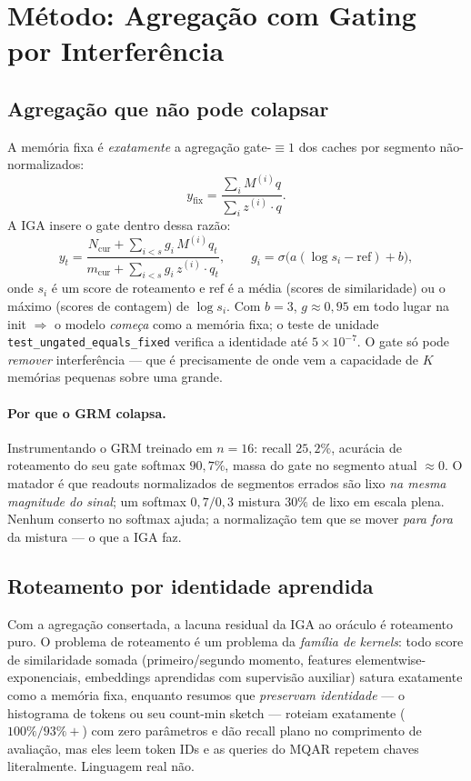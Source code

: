 \documentclass[11pt]{article}
\begin{document}
\section{M\'etodo: Agrega\c{c}\~ao com Gating por Interfer\^encia}

\subsection{Agrega\c{c}\~ao que n\~ao pode colapsar}

A mem\'oria fixa \'e \emph{exatamente} a agrega\c{c}\~ao gate-$\equiv 1$ dos caches
por segmento n\~ao-normalizados:
\[
y_{\mathrm{fix}} = \frac{\sum_i M^{(i)}q}{\sum_i z^{(i)}\!\cdot\!q}.
\]
A IGA insere o gate dentro dessa raz\~ao:
\[
y_t = \frac{N_{\mathrm{cur}} + \sum_{i<s} g_i\,M^{(i)}q_t}
            {m_{\mathrm{cur}} + \sum_{i<s} g_i\,z^{(i)}\!\cdot\!q_t},
\qquad
g_i = \sigma\!\big(a(\log s_i - \mathrm{ref}) + b\big),
\]
onde $s_i$ \'e um score de roteamento e $\mathrm{ref}$ \'e a m\'edia (scores de
similaridade) ou o m\'aximo (scores de contagem) de $\log s_i$. Com $b=3$,
$g\approx 0{,}95$ em todo lugar na init $\Rightarrow$ o modelo \emph{come\c{c}a}
como a mem\'oria fixa; o teste de unidade \texttt{test\_ungated\_equals\_fixed}
verifica a identidade at\'e $5\times10^{-7}$. O gate s\'o pode \emph{remover}
interfer\^encia --- que \'e precisamente de onde vem a capacidade de $K$ mem\'orias
pequenas sobre uma grande.

\paragraph{Por que o GRM colapsa.} Instrumentando o GRM treinado em $n=16$: recall
$25{,}2\%$, acur\'acia de roteamento do seu gate softmax $90{,}7\%$, massa do gate
no segmento atual $\approx 0$. O matador \'e que readouts normalizados de
segmentos errados s\~ao lixo \emph{na mesma magnitude do sinal}; um softmax
$0{,}7/0{,}3$ mistura $30\%$ de lixo em escala plena. Nenhum conserto no softmax
ajuda; a normaliza\c{c}\~ao tem que se mover \emph{para fora} da mistura --- o que
a IGA faz.

\subsection{Roteamento por identidade aprendida}

Com a agrega\c{c}\~ao consertada, a lacuna residual da IGA ao or\'aculo \'e
roteamento puro. O problema de roteamento \'e um problema da \emph{fam\'ilia de
kernels}: todo score de similaridade somada (primeiro/segundo momento, features
elementwise-exponenciais, embeddings aprendidas com supervis\~ao auxiliar) satura
exatamente como a mem\'oria fixa, enquanto resumos que \emph{preservam
identidade} --- o histograma de tokens ou seu count-min sketch
\citep{cormode2005countmin} --- roteiam exatamente ($100\%/93\%+$) com zero
par\^ametros e d\~ao recall plano no comprimento de avalia\c{c}\~ao, mas eles leem
token IDs e as queries do MQAR repetem chaves literalmente. Linguagem real n\~ao.
\end{document}
